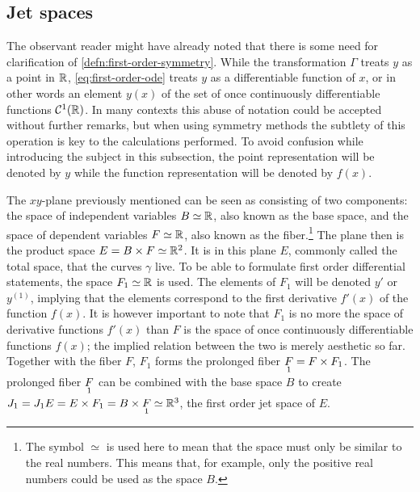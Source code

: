 \subsection{Jet spaces} \label{subsec:jet-spaces}

The observant reader might have already noted that there is some need for clarification of \cref{defn:first-order-symmetry}.
While the transformation \(\Gamma\) treats \(y\) as a point in \(\reals\), \cref{eq:first-order-ode} treats \(y\) as a differentiable function of \(x\), or in other words an element \(y(x)\) of the set of once continuously differentiable functions \(\mathcal{C}^1(\reals)\).
In many contexts this abuse of notation could be accepted without further remarks, but when using symmetry methods the subtlety of this operation is key to the calculations performed.
To avoid confusion while introducing the subject in this subsection, the point representation will be denoted by \(y\) while the function representation will be denoted by \(f(x)\).

The \(xy\)-plane previously mentioned can be seen as consisting of two components: the space of independent variables \(B \simeq \reals\), also known as the base space, and the space of dependent variables \(F \simeq \reals\), also known as the fiber.\footnote{The symbol \(\simeq\) is used here to mean that the space must only be similar to the real numbers. This means that, for example, only the positive real numbers could be used as the space \(B\).}
The plane then is the product space \(E = B \times F \simeq \reals^2\).
It is in this plane \(E\), commonly called the total space, that the curves \(\gamma\) live.
To be able to formulate first order differential statements, the space \(F_1 \simeq \reals\) is used.
The elements of \(F_1\) will be denoted \(y'\) or \(y^{(1)}\), implying that the elements correspond to the first derivative \(f'(x)\) of the function \(f(x)\).
It is however important to note that \(F_1\) is no more the space of derivative functions \(f'(x)\) than \(F\) is the space of once continuously differentiable functions \(f(x)\); the implied relation between the two is merely aesthetic so far.
Together with the fiber \(F\), \(F_1\) forms the prolonged fiber \(\prolong{F}{1} = F \times F_1\).
The prolonged fiber \(\prolong{F}{1}\) can be combined with the base space \(B\) to create \(J_1 = J_1 E = E \times F_1 = B \times \prolong{F}{1} \simeq \reals^3\), the first order jet space of \(E\).%

